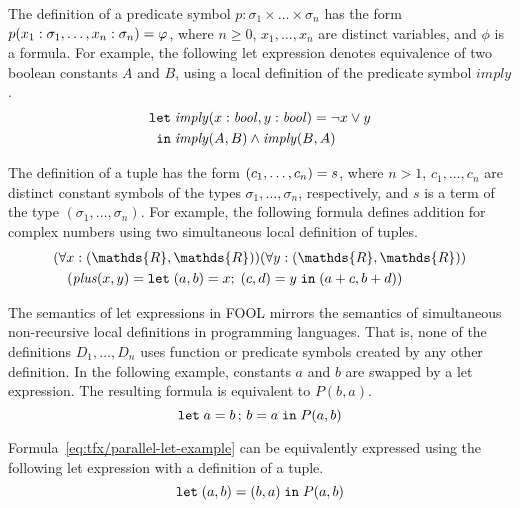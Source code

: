 The definition of a predicate symbol $p:\sigma_1\times\ldots\times\sigma_n$ has 
the form ${p(x_1:\sigma_1,\ldots,x_n:\sigma_n)}={\varphi}$, where 
$n \geq 0$, $x_1,\ldots,x_n$ are distinct variables, and $\phi$ is a formula.
For example, the following let expression denotes equivalence of two boolean 
constants $A$ and $B$, using a local definition of the predicate symbol 
$\mathit{imply}$.
\begin{equation}\label{eq:tfx/fool-let-imply2}
\begin{aligned}
\mathtt{let}\;&{\mathit{imply}(x:\mathit{bool},y:\mathit{bool})}={\neg x \lor y}\\
 \mathtt{in}\;&\mathit{imply}(A,B)\wedge\mathit{imply}(B,A)
\end{aligned}
\end{equation}

The definition of a tuple has the form ${(c_1,\ldots,c_n)}={s}$, where
$n > 1$, $c_1,\ldots,c_n$ are distinct constant symbols of the types
$\sigma_1,\ldots,\sigma_n$, respectively, and $s$ is a term of the type
$(\sigma_1,\ldots,\sigma_n)$. 
For example, the following formula defines addition for complex numbers using 
two simultaneous local definition of tuples.
\begin{equation}\label{eq:tfx/fool-tuple-let}
  \begin{aligned}
  &(\forall x:(\mathds{R},\mathds{R}))(\forall y:(\mathds{R},\mathds{R}))\\
  &\quad(\mathit{plus}(x,y) = \letinpar{(a,b)}{x}{(c,d)}{y}{\tuple{a+c,b+d})}
  \end{aligned}
\end{equation}

The semantics of let expressions in FOOL mirrors the semantics of
simultaneous non-recursive local definitions in programming languages. 
That is, none of the definitions $D_1,\ldots,\allowbreak D_n$ uses function or
predicate symbols created by any other definition. 
In the following example, constants $a$ and $b$ are swapped by a let 
expression. 
The resulting formula is equivalent to $P(b, a)$.
\begin{equation}\label{eq:tfx/parallel-let-example}
\mathtt{let}\;{a}={b}\,;\,{b}={a}\;\mathtt{in}\;P(a, b)
\end{equation}

Formula~\ref{eq:tfx/parallel-let-example} can be equivalently expressed using 
the following let expression with a definition of a tuple.
\begin{equation}\label{eq:tfx/parallel-let-tuple-example}
\mathtt{let}\;{(a,b)}={(b,a)}\;\mathtt{in}\;P(a, b)
\end{equation}

